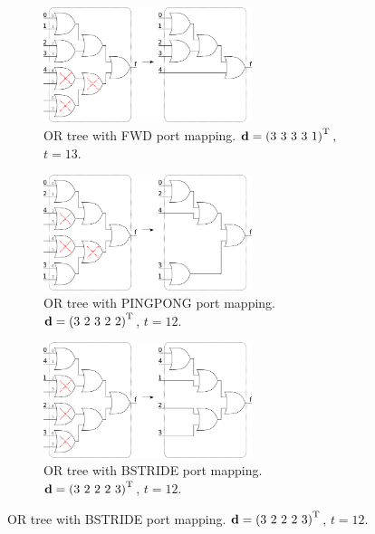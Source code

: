 \documentclass[11pt,twoside]{article}
\begin{document}
\begin{figure}[h]
    \centering
    \begin{subfigure}[t]{0.9\textwidth}
        \centering
        \includegraphics[width=0.67\textwidth]{OR_b2_w5_FWD.png}
        \caption{OR tree with FWD port mapping.
                 $\mathbf{d} = {(3\ 3\ 3\ 3\ 1)}^\mathrm{T}$,
                 $t = 13$.
                 \label{fig:OR_b2_w5_FWD}}
    \end{subfigure}

    \begin{subfigure}[t]{0.9\textwidth}
        \centering
        \includegraphics[width=0.67\textwidth]{OR_b2_w5_PINGPONG.png}
        \caption{OR tree with PINGPONG port mapping.
                 $\mathbf{d} = {(3\ 2\ 3\ 2\ 2)}^\mathrm{T}$,
                 $t = 12$.
                 \label{fig:OR_b2_w5_PINGPONG}}
    \end{subfigure}

    \begin{subfigure}[t]{0.9\textwidth}
        \centering
        \includegraphics[width=0.67\textwidth]{OR_b2_w5_BSTRIDE.png}
        \caption{OR tree with BSTRIDE port mapping.
                 $\mathbf{d} = {(3\ 2\ 2\ 2\ 3)}^\mathrm{T}$,
                 $t = 12$.
                 \label{fig:OR_b2_w5_BSTRIDE}}
    \end{subfigure}


\end{figure}
\end{document}

